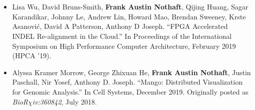 \documentclass[10pt]{article} %
\begin{document}
\begin {minipage}[t]{0.2\linewidth}
\vspace{0pt}
\end {minipage}
\begin {minipage}[t]{0.8\linewidth}
\vspace{0pt}
 \\
 \\
 \\
 \\

 \\
 \\
 \\
\end {minipage}

\begin {minipage}[t]{0.2\linewidth}
\vspace{0pt}
\end {minipage}
\begin {minipage}[t]{0.8\linewidth}
\vspace{0pt}


\setdefaultleftmargin{13pt}{}{}{}{}{}
\begin{itemize}
\item {Lisa Wu, David Bruns-Smith, \textbf{Frank Austin Nothaft}, Qijing Huang, Sagar
Karandikar, Johnny Le, Andrew Lin, Howard Mao, Brendan Sweeney, Krste Asanovi\'{c}, David A Patterson, Anthony D Joseph. “FPGA Accelerated INDEL Re-alignment in the Cloud.” In Proceedings of the International Symposium on High
Performance Computer Architecture, February 2019 (HPCA ’19).}
\item {Alyssa Kramer Morrow, George Zhixuan He, \textbf{Frank Austin Nothaft}, Justin Paschall,
Nir Yosef, Anthony D. Joseph. ``Mango: Distributed Visualization for Genomic Analysis.'' In Cell Systems, December 2019. Originally posted as
\emph{BioR$\chi$iv:360842}, July 2018.}
\end{itemize}
\end {minipage}
\end{document}
